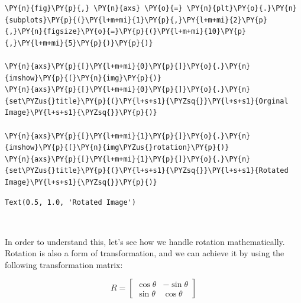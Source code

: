 \begin{tcolorbox}[breakable, size=fbox, boxrule=1pt, pad at break*=1mm,colback=cellbackground, colframe=cellborder]
	\begin{Verbatim}[commandchars=\\\{\}]
\PY{n}{fig}\PY{p}{,} \PY{n}{axs} \PY{o}{=} \PY{n}{plt}\PY{o}{.}\PY{n}{subplots}\PY{p}{(}\PY{l+m+mi}{1}\PY{p}{,}\PY{l+m+mi}{2}\PY{p}{,}\PY{n}{figsize}\PY{o}{=}\PY{p}{(}\PY{l+m+mi}{10}\PY{p}{,}\PY{l+m+mi}{5}\PY{p}{)}\PY{p}{)}
		
\PY{n}{axs}\PY{p}{[}\PY{l+m+mi}{0}\PY{p}{]}\PY{o}{.}\PY{n}{imshow}\PY{p}{(}\PY{n}{img}\PY{p}{)}
\PY{n}{axs}\PY{p}{[}\PY{l+m+mi}{0}\PY{p}{]}\PY{o}{.}\PY{n}{set\PYZus{}title}\PY{p}{(}\PY{l+s+s1}{\PYZsq{}}\PY{l+s+s1}{Orginal Image}\PY{l+s+s1}{\PYZsq{}}\PY{p}{)}
		
\PY{n}{axs}\PY{p}{[}\PY{l+m+mi}{1}\PY{p}{]}\PY{o}{.}\PY{n}{imshow}\PY{p}{(}\PY{n}{img\PYZus{}rotation}\PY{p}{)}
\PY{n}{axs}\PY{p}{[}\PY{l+m+mi}{1}\PY{p}{]}\PY{o}{.}\PY{n}{set\PYZus{}title}\PY{p}{(}\PY{l+s+s1}{\PYZsq{}}\PY{l+s+s1}{Rotated Image}\PY{l+s+s1}{\PYZsq{}}\PY{p}{)}
	\end{Verbatim}
\end{tcolorbox}


\begin{tcolorbox}[breakable, size=fbox, boxrule=.5pt, pad at break*=1mm, opacityfill=0]
	\begin{Verbatim}[commandchars=\\\{\}]
Text(0.5, 1.0, 'Rotated Image')
	\end{Verbatim}
\end{tcolorbox}

\begin{center}
\end{center}
{ \hspace*{\fill} \\}

In order to understand this, let's see how we handle rotation mathematically. Rotation is also a form of transformation, and we can achieve it by using the following transformation matrix:

\begin{center}
	\[
	\textit{R} =  
	\begin{bmatrix}
		\cos\theta & -\sin\theta \\
		\sin\theta & \cos\theta
	\end{bmatrix}
	\]
\end{center}

